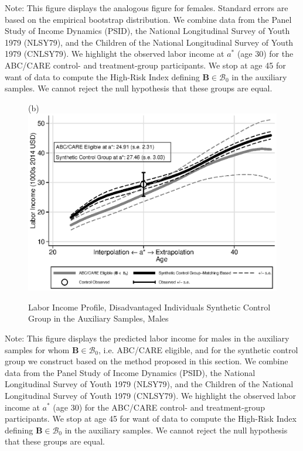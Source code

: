 \documentclass[static]{JJH-Beamer}
\begin{document}
{\tiny \flushleft Note: This figure displays the analogous figure for females. Standard errors are based on the empirical bootstrap distribution. We combine data from the Panel Study of Income Dynamics (PSID), the National Longitudinal Survey of Youth 1979 (NLSY79), and the Children of the National Longitudinal Survey of Youth 1979 (CNLSY79). We highlight the observed labor income at $a^*$ (age 30) for the ABC/CARE control- and treatment-group participants. We stop at age 45 for want of data to compute the High-Risk Index defining $\bm{B} \in \mathcal{B}_0$ in the auxiliary samples. We cannot reject the null hypothesis that these groups are equal.\\}

\clearpage
\begin{frame}

\begin{figure}[H]
\addtocounter{figure}{-1}
\caption{Labor Income Profile, Disadvantaged Individuals Synthetic Control Group in the Auxiliary Samples, Males}\label{figure:controltests}
\begin{center}
(b)\\
\includegraphics[width=.65\textwidth]{output/abccare_disad_1}
\end{center}
\end{figure}

\end{frame}

\clearpage

{\small \flushleft Note: This figure displays the predicted labor income for males in the auxiliary samples for whom $\bm{B} \in \mathcal{B}_0$, i.e. ABC/CARE eligible, and for the synthetic control group we construct based on the method proposed in this section. We combine data from the Panel Study of Income Dynamics (PSID), the National Longitudinal Survey of Youth 1979 (NLSY79), and the Children of the National Longitudinal Survey of Youth 1979 (CNLSY79). We highlight the observed labor income at $a^*$ (age 30) for the ABC/CARE control- and treatment-group participants. We stop at age 45 for want of data to compute the High-Risk Index defining $\bm{B} \in \mathcal{B}_0$ in the auxiliary samples. We cannot reject the null hypothesis that these groups are equal.\\}
\end{document}
